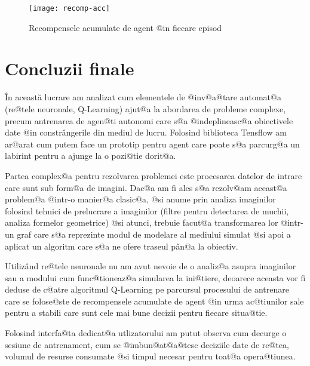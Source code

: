 \begin{figure}[h]
	\centering
	\texttt{[image: recomp-acc]}
	\caption{Recompensele acumulate de agent @in fiecare episod}
	\label{fig:recomp-acc}
\end{figure}










\chapter*{Concluzii finale}



\^ In aceast\u a lucrare am analizat cum elementele de @inv@a@tare automat@a (re@tele neuronale, Q-Learning) ajut@a la abordarea de probleme complexe, precum antrenarea de agen@ti autonomi care s@a @indeplineasc@a obiectivele date @in constr\^ angerile din mediul de lucru. Folosind biblioteca Tensflow am ar@arat cum putem face un prototip pentru agent care poate s@a parcurg@a un labirint pentru a ajunge la o pozi@tie dorit@a. 

Partea complex@a pentru rezolvarea problemei este procesarea datelor de intrare care sunt sub form@a de imagini. Dac@a am fi ales s@a rezolv@am aceast@a problem@a @intr-o manier@a clasic@a, @si anume prin analiza imaginilor folosind tehnici de prelucrare a imaginilor (filtre pentru detectarea de muchii, analiza formelor geometrice) @si atunci, trebuie facut@a transformarea lor @intr-un graf care s@a reprezinte modul de modelare al mediului simulat @si apoi a aplicat un algoritm care s@a ne ofere traseul p\^ an@a la obiectiv.

Utiliz\^ and re@tele neuronale nu am avut nevoie de o analiz@a asupra imaginilor sau a modului cum func@tioneaz@a simularea la ini@tiere, deoarece aceasta vor fi deduse de c@atre algoritmul Q-Learning pe parcursul procesului de antrenare care se folose@ste de recompensele acumulate de agent @in urma ac@tiunilor sale pentru a stabili care sunt cele mai bune decizii pentru fiecare situa@tie.

Folosind interfa@ta dedicat@a utlizatorului am putut observa cum decurge o sesiune de antrenament, cum se @imbun@at@a@tesc deciziile date de re@tea, volumul de resurse consumate @si timpul necesar pentru toat@a opera@tiunea.

